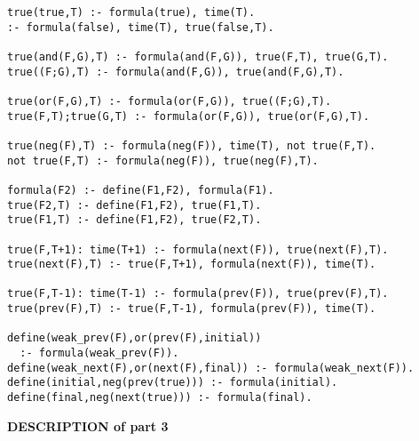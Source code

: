 \begin{center}
\begin{minipage}{\linewidth}
  \begin{lstlisting}[]
true(true,T) :- formula(true), time(T).
:- formula(false), time(T), true(false,T).

true(and(F,G),T) :- formula(and(F,G)), true(F,T), true(G,T).
true((F;G),T) :- formula(and(F,G)), true(and(F,G),T).

true(or(F,G),T) :- formula(or(F,G)), true((F;G),T).
true(F,T);true(G,T) :- formula(or(F,G)), true(or(F,G),T).

true(neg(F),T) :- formula(neg(F)), time(T), not true(F,T).
not true(F,T) :- formula(neg(F)), true(neg(F),T).

formula(F2) :- define(F1,F2), formula(F1).
true(F2,T) :- define(F1,F2), true(F1,T).
true(F1,T) :- define(F1,F2), true(F2,T).

true(F,T+1): time(T+1) :- formula(next(F)), true(next(F),T).
true(next(F),T) :- true(F,T+1), formula(next(F)), time(T).

true(F,T-1): time(T-1) :- formula(prev(F)), true(prev(F),T).
true(prev(F),T) :- true(F,T-1), formula(prev(F)), time(T).

define(weak_prev(F),or(prev(F),initial))
  :- formula(weak_prev(F)).
define(weak_next(F),or(next(F),final)) :- formula(weak_next(F)).
define(initial,neg(prev(true))) :- formula(initial).
define(final,neg(next(true))) :- formula(final).
\end{lstlisting}
\end{minipage}
\end{center}

\textbf{DESCRIPTION of part 3}

